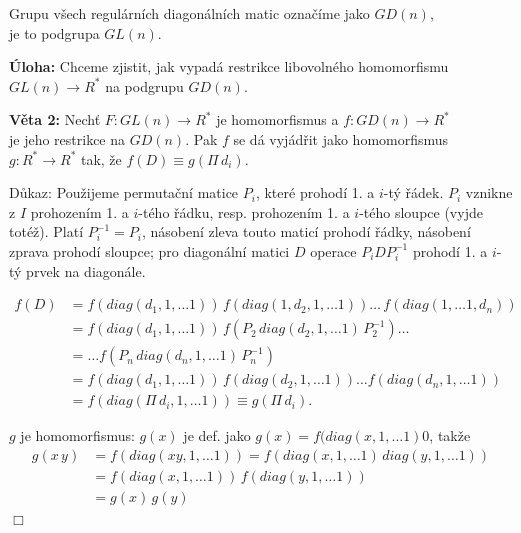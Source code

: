 \documentclass[12pt]{article}
\begin{document}
\vspace{2mm}

Grupu všech regulárních diagonálních matic označíme jako $GD(n)$,\\
 je to podgrupa $GL(n)$.
\vspace{4mm}

\textbf{Úloha:} Chceme zjistit, jak vypadá restrikce libovolného homomorfismu\\ $GL(n) \rightarrow R^*$ na podgrupu $GD(n)$. 
\vspace{2mm}

\textbf{Věta 2:} Nechť $F: GL(n) \rightarrow R^*$ je homomorfismus a
 $f: GD(n) \rightarrow R^*$ \\
 je jeho restrikce na $GD(n)$. Pak $f$ se dá vyjádřit jako homomorfismus \\
 $g: R^* \rightarrow R^*$ tak, že $f(D) \equiv g(\Pi\, d_i)$.
\vspace{2mm}

Důkaz: 
\vspace{1mm}
Použijeme permutační matice $P_i$, které prohodí 1. a $i$-tý řádek. $P_i$ vznikne z $I$ prohozením 1. a $i$-tého řádku, resp. prohozením 1. a $i$-tého sloupce (vyjde totéž). Platí $P_i^{-1} = P_i$, násobení zleva touto maticí prohodí řádky, násobení zprava prohodí sloupce; pro diagonální matici $D$ operace $P_i D P_i^{-1}$ prohodí 1. a $i$-tý prvek na diagonále.

\begin{align*}
f(D) &=  f(diag(d_1, 1, \dots 1))\, f(diag(1, d_2, 1, \dots 1)) \dots \, f(diag(1, \dots 1,  d_n)) \\
  &= f(diag(d_1, 1, \dots 1))\,f(P_2\,diag(d_2, 1, \dots 1)\,P_2^{-1})\dots \\
  &= \dots f(P_n\,diag(d_n, 1, \dots 1)\,P_n^{-1}) \\
  &= f(diag(d_1, 1, \dots 1))\,f(diag(d_2, 1, \dots 1))\dots f(diag(d_n, 1, \dots 1))\, \\
  &= f(diag(\Pi\, d_i, 1, \dots 1)) \equiv g(\Pi\, d_i).
\end{align*}

$g$ je homomorfismus: $g(x)$ je def. jako $g(x) = f(diag(x, 1, \dots 1)0$, takže
\begin{align*}
g(x\,y) &= f(diag(xy, 1, \dots 1)) 
    = f(diag(x, 1, \dots 1)\, diag(y, 1, \dots 1)) \\
  &= f(diag(x, 1, \dots 1))\,f(diag(y, 1, \dots 1)) \\
  &= g(x)\,g(y)
\end{align*}
$\Box$
\end{document}
